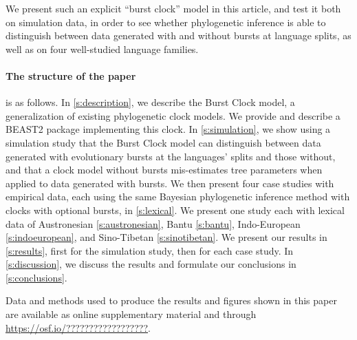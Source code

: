 \documentclass[]{rsos}%
\begin{document}
We present such an explicit “burst clock” model in this article, and
test it both on simulation data, in order to see whether phylogenetic inference is able to
distinguish between data generated with and without bursts at language splits, as
well as on four well-studied language families.

\paragraph{The structure of the paper} is as follows. In
\cref{s:description}, we describe the Burst Clock model, a generalization of
existing phylogenetic clock models. We provide and describe a BEAST2 \parencite{drummond2015bayesian} package
implementing this clock. In \cref{s:simulation}, we show using a simulation
study that the Burst Clock model can distinguish between data generated with
evolutionary bursts at the languages' splits and those without, and that
a clock model without bursts mis-estimates tree parameters when applied to data
generated with bursts.
We then present four case studies with empirical data, each using
the same Bayesian phylogenetic inference method with clocks with optional bursts, in
\cref{s:lexical}. We present one study each with
lexical data of Austronesian \ref{s:austronesian}, Bantu \ref{s:bantu}, Indo-European \ref{s:indoeuropean}, and Sino-Tibetan \ref{s:sinotibetan}.
We present our results in
\cref{s:results}, first for the simulation study, then for each case study.
In \cref{s:discussion}, we discuss the results and formulate our conclusions in \cref{s:conclusions}.

Data and methods used to produce the results and figures shown in this paper are
available as online supplementary material and through
\url{https://osf.io/??????????????????}.
\end{document}
